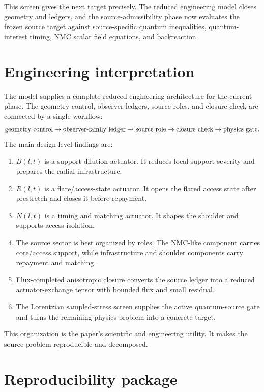 \documentclass[11pt]{article}
\begin{document}
This screen gives the next target precisely.  The reduced engineering model closes geometry and ledgers, and the source-admissibility phase now evaluates the frozen source target against source-specific quantum inequalities, quantum-interest timing, NMC scalar field equations, and backreaction.

\section{Engineering interpretation}

The model supplies a complete reduced engineering architecture for the current phase.  The geometry control, observer ledgers, source roles, and closure check are connected by a single workflow:
\begin{equation}
 \hbox{geometry control}
 \rightarrow
 \hbox{observer-family ledger}
 \rightarrow
 \hbox{source role}
 \rightarrow
 \hbox{closure check}
 \rightarrow
 \hbox{physics gate}.
 \label{eq:workflow}
\end{equation}
The main design-level findings are:
\begin{enumerate}
\item $B(l,t)$ is a support-dilution actuator.  It reduces local support severity and prepares the radial infrastructure.
\item $R(l,t)$ is a flare/access-state actuator.  It opens the flared access state after prestretch and closes it before repayment.
\item $N(l,t)$ is a timing and matching actuator.  It shapes the shoulder and supports access isolation.
\item The source sector is best organized by roles.  The NMC-like component carries core/access support, while infrastructure and shoulder components carry repayment and matching.
\item Flux-completed anisotropic closure converts the source ledger into a reduced actuator-exchange tensor with bounded flux and small residual.
\item The Lorentzian sampled-stress screen supplies the active quantum-source gate and turns the remaining physics problem into a concrete target.
\end{enumerate}
This organization is the paper's scientific and engineering utility.  It makes the source problem reproducible and decomposed.

\section{Reproducibility package}
\end{document}
